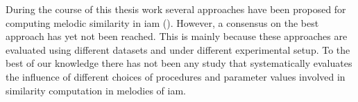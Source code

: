 During the course of this thesis work several approaches have been proposed for computing melodic similarity in \gls{iam} (). However, a consensus on the best approach has yet not been reached. This is mainly because these approaches are evaluated using different datasets and under different experimental setup. To the best of our knowledge there has not been any study that systematically evaluates the influence of different choices of procedures and parameter values involved in similarity computation in melodies of \gls{iam}.






